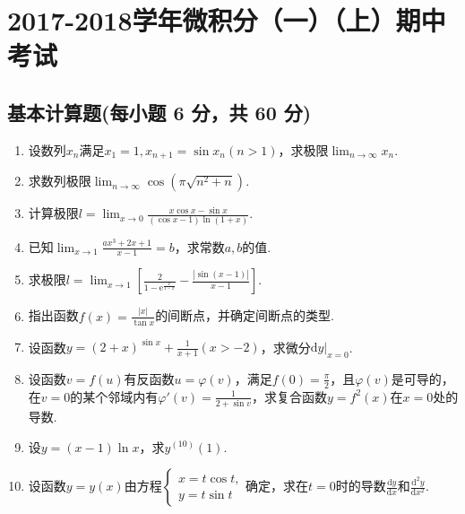 \documentclass[../Main.tex]{subfiles}
\begin{document}
\chapter{2017-2018学年微积分（一）（上）期中考试}

\section{基本计算题(每小题 6 分，共 60 分)}
\begin{enumerate}
    \item 设数列$x_{n}$满足$x_{1}=1,x_{n+1}=\sin x_{n}(n>1)$，求极限$\lim_{n\to\infty}
              x_{n}$.
          \vspace{11em}

    \item 求数列极限$\lim_{n\to \infty}\cos\left(\pi\sqrt{n^{2}+n}\right)$.
          \vspace{10em}

    \item 计算极限$l=\lim_{x\to 0}\frac{x\cos x-\sin x}{(\cos x-1)\ln(1+x)}$.
          \vspace{11em}

    \item 已知$\lim_{x\to1}\frac{ax^{3}+2x+1}{x-1}=b$，求常数$a,b$的值.
          \vspace{10em}

    \item 求极限$l=\lim_{x\to1}\left[\frac{2}{1-\mathrm{e}^{\frac{x}{1-x}}}-\frac{|\sin(x-1)|}{x-1}
                  \right]$.
          \vspace{10em}

    \item 指出函数$f(x)=\frac{|x|}{\tan x}$的间断点，并确定间断点的类型.
          \vspace{10em}

    \item 设函数$y=(2+x)^{\sin x}+\frac{1}{x+1}(x>-2)$，求微分$\left.\mathrm{d}y\right
              |_{x=0}$.
          \vspace{11em}

    \item 设函数$v=f(u)$有反函数$u=\varphi(v)$，满足$f(0)=\frac{\pi}{2}$，且$\varphi
              (v)$是可导的，在$v=0$的某个邻域内有$\varphi'(v)=\frac{1}{2+\sin v}$，求复合函数$y
              =f^{2}(x)$在$x=0$处的导数.
          \vspace{12em}

    \item 设$y=(x-1)\ln x$，求$y^{(10)}(1)$.
          \vspace{8em}

    \item 设函数$y=y(x)$由方程$\begin{cases}
                  x=t\cos t, \\
                  y=t\sin t
              \end{cases}$确定，求在$t=0$时的导数$\frac{\mathrm{d}y}{\mathrm{d}x}$和$\frac{\mathrm{d}^{2}y}{\mathrm{d}x^{2}}$.
          \vspace{8em}
\end{enumerate}
\end{document}
